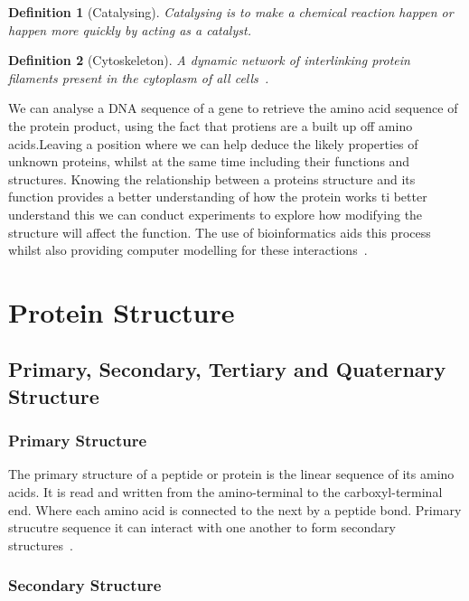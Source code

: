 \documentclass{report}
\newtheorem{definition}{Definition}[section]
\begin{document}
\begin{definition}[Catalysing]
    Catalysing is to make a chemical reaction happen or happen more quickly by acting as a catalyst.
\end{definition}

\begin{definition}[Cytoskeleton]
    A dynamic network of interlinking protein filaments present in the cytoplasm of all cells~\cite{zvelebil_understanding_2008}. 
\end{definition}

We can analyse a DNA sequence of a gene to retrieve the amino acid sequence of the protein product, using the fact that protiens are a built up off amino acids.Leaving a position where we can help deduce the likely properties of unknown proteins, whilst at the same time including their functions and structures. Knowing the relationship between a proteins structure and its function provides a better understanding of how the protein works ti better understand this we can conduct experiments to explore how modifying the structure will affect the function. The use of bioinformatics aids this process whilst also providing computer modelling for these interactions~\cite{zvelebil_understanding_2008}.

\section{Protein Structure}

\subsection{Primary, Secondary, Tertiary and Quaternary Structure}

\subsubsection{Primary Structure}

The primary structure of a peptide or protein is the linear sequence of its amino acids. It is read and written from the amino-terminal to the carboxyl-terminal end. Where each amino acid is connected to the next by a peptide bond. Primary strucutre sequence it can interact with one another to form secondary structures~\cite{noauthor_levels_nodate}.

\subsubsection{Secondary Structure}
\end{document}
